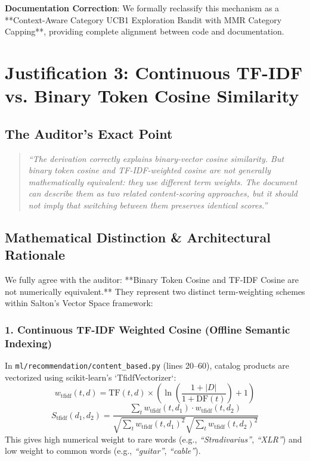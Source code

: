 \documentclass[11pt,a4paper]{article}
\begin{document}
\textbf{Documentation Correction}: We formally reclassify this mechanism as a **Context-Aware Category UCB1 Exploration Bandit with MMR Category Capping**, providing complete alignment between code and documentation.

\section{Justification 3: Continuous TF-IDF vs. Binary Token Cosine Similarity}

\subsection{The Auditor's Exact Point}
\begin{quote}
\textit{``The derivation correctly explains binary-vector cosine similarity. But binary token cosine and TF-IDF-weighted cosine are not generally mathematically equivalent: they use different term weights. The document can describe them as two related content-scoring approaches, but it should not imply that switching between them preserves identical scores.''}
\end{quote}

\subsection{Mathematical Distinction \& Architectural Rationale}
We fully agree with the auditor: **Binary Token Cosine and TF-IDF Cosine are not numerically equivalent.** They represent two distinct term-weighting schemes within Salton's Vector Space framework:

\subsubsection{1. Continuous TF-IDF Weighted Cosine (Offline Semantic Indexing)}
In \texttt{ml/recommendation/content\_based.py} (lines 20--60), catalog products are vectorized using scikit-learn's `TfidfVectorizer`:
\begin{equation}
    w_{\text{tfidf}}(t, d) = \text{TF}(t, d) \times \left( \ln\left(\frac{1 + |D|}{1 + \text{DF}(t)}\right) + 1 \right)
\end{equation}
\begin{equation}
    S_{\text{tfidf}}(d_1, d_2) = \frac{\sum_t w_{\text{tfidf}}(t, d_1) \cdot w_{\text{tfidf}}(t, d_2)}{\sqrt{\sum_t w_{\text{tfidf}}(t, d_1)^2} \sqrt{\sum_t w_{\text{tfidf}}(t, d_2)^2}}
\end{equation}
This gives high numerical weight to rare words (e.g., \textit{``Stradivarius''}, \textit{``XLR''}) and low weight to common words (e.g., \textit{``guitar''}, \textit{``cable''}).
\end{document}
